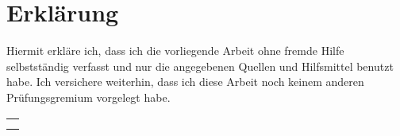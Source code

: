 
\thispagestyle{empty}
\section*{Erklärung}
Hiermit erkläre ich, dass ich die vorliegende Arbeit ohne fremde Hilfe selbstständig
verfasst und nur die angegebenen Quellen und Hilfsmittel benutzt habe. Ich versichere
weiterhin, dass ich diese Arbeit noch keinem anderen Prüfungsgremium vorgelegt habe.


\vspace{5em}

\begin{flushleft}
	\begin{tabular}{l}
		\hline \\
		\author, \location, den \date
	\end{tabular}
\end{flushleft}